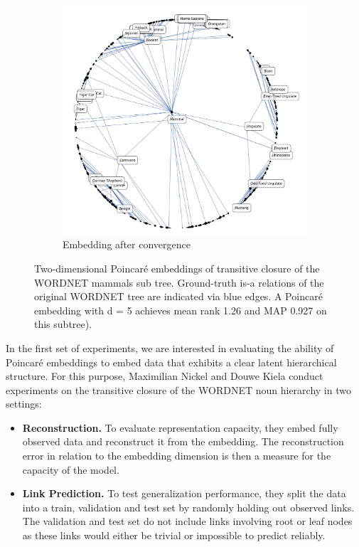 \begin{figure}[htb]
\begin{adjustbox}{minipage=\linewidth,scale=0.7}
\begin{subfigure}[b]{\columnwidth}
            \includegraphics[width=\textwidth]{lectures/11-b/Images/1-5.png}
            \caption{Embedding after convergence}       
            \label{fig:linguistics2}
        \end{subfigure}
    \end{adjustbox}
    \caption{Two-dimensional Poincaré embeddings of transitive closure of the WORDNET mammals sub tree. Ground-truth is-a relations of the original WORDNET tree are indicated via blue edges. A Poincaré embedding with d = 5 achieves mean rank 1.26 and MAP 0.927 on this subtree).}\label{fig:liguistics}
    
    
\end{figure}

In the first set of experiments, we are interested in evaluating the ability of Poincaré embeddings to embed data that exhibits a clear latent hierarchical structure. For this purpose, Maximilian Nickel and Douwe Kiela \cite{NIPS2017_7213} conduct experiments on the transitive closure of the WORDNET noun hierarchy in two settings:
\begin{itemize}

    \item \textbf{Reconstruction.} To evaluate representation capacity, they embed fully observed data and reconstruct it from the embedding. The reconstruction error in relation to the embedding dimension is then a measure for the capacity of the model.
    \item \textbf{Link Prediction.} To test generalization performance, they split the data into a train, validation and test set by randomly holding out observed links. The validation and test set do not include links involving root or leaf nodes as these links would either be trivial or impossible to predict reliably.
\end{itemize}

